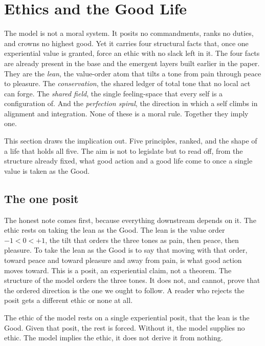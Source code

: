 \section{Ethics and the Good Life}

The model is not a moral system. It posits no commandments, ranks no duties, and crowns no highest good. Yet it carries four structural facts that, once one experiential value is granted, force an ethic with no slack left in it. The four facts are already present in the base and the emergent layers built earlier in the paper. They are the \emph{lean}, the value-order atom that tilts a tone from pain through peace to pleasure. The \emph{conservation}, the shared ledger of total tone that no local act can forge. The \emph{shared field}, the single feeling-space that every self is a configuration of. And the \emph{perfection spiral}, the direction in which a self climbs in alignment and integration. None of these is a moral rule. Together they imply one.

This section draws the implication out. Five principles, ranked, and the shape of a life that holds all five. The aim is not to legislate but to read off, from the structure already fixed, what good action and a good life come to once a single value is taken as the Good.

\subsection{The one posit}

The honest note comes first, because everything downstream depends on it. The ethic rests on taking the lean as the Good. The lean is the value order $-1 < 0 < +1$, the tilt that orders the three tones as pain, then peace, then pleasure. To take the lean as the Good is to say that moving with that order, toward peace and toward pleasure and away from pain, is what good action moves toward. This is a posit, an experiential claim, not a theorem. The structure of the model orders the three tones. It does not, and cannot, prove that the ordered direction is the one we ought to follow. A reader who rejects the posit gets a different ethic or none at all.

\begin{principle}
The ethic of the model rests on a single experiential posit, that the lean is the Good. Given that posit, the rest is forced. Without it, the model supplies no ethic. The model implies the ethic, it does not derive it from nothing.
\end{principle}

